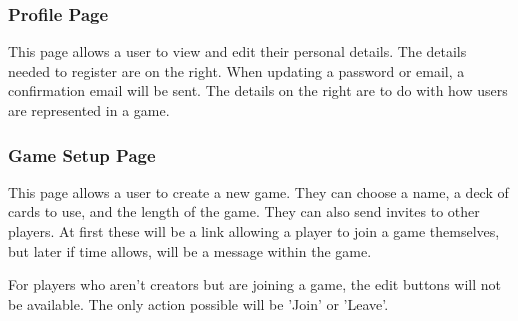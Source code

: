 \subsubsection{Profile Page}
\begin{center}
\end{center}
This page allows a user to view and edit their personal details. The details needed to register are on the right. When updating a password or email, a confirmation email will be sent. The details on the right are to do with how users are represented in a game.

\subsubsection{Game Setup Page}
\begin{center}
\end{center}
This page allows a user to create a new game. They can choose a name, a deck of cards to use, and the length of the game. They can also send invites to other players. At first these will be a link allowing a player to join a game themselves, but later if time allows, will be a message within the game.

For players who aren't creators but are joining a game, the edit buttons will not be available. The only action possible will be 'Join' or 'Leave'.

